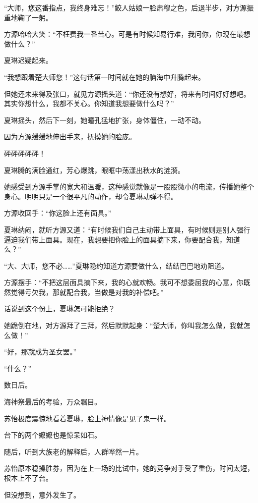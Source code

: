 
\begin{this_body}

“大师，您这番指点，我终身难忘！”鲛人姑娘一脸肃穆之色，后退半步，对方源振重地鞠了一躬。

方源哈哈大笑：“不枉费我一番苦心。可是有时候知易行难，我问你，你现在最想做什么？”

夏琳迟疑起来。

“我想跟着楚大师您！”这句话第一时间就在她的脑海中升腾起来。

但她还未来得及张口，就见方源摇头道：“你还没有想好，将来有时间好好想吧。其实你想什么，我都不关心。你知道我想要做什么吗？”

夏琳摇头，然后下一刻，她瞳孔猛地扩张，身体僵住，一动不动。

因为方源缓缓地伸出手来，抚摸她的脸庞。

砰砰砰砰砰！

夏琳腾的满脸通红，芳心爆跳，眼眶中荡漾出秋水的涟漪。

她感受到方源手掌的宽大和温暖，这种感觉就像是一股股微小的电流，传播她整个身心。明明只是一个很平凡的动作，却令夏琳动弹不得。

方源收回手：“你这脸上还有面具。”

夏琳纳闷，就听方源又道：“有时候我们自己主动带上面具，有时候则是别人强行逼迫我们带上面具。现在，我想要把你脸上的面具摘下来，你要配合我，知道么？”

“大、大师，您不必……”夏琳隐约知道方源要做什么，结结巴巴地劝阻道。

方源摆手：“不把这层面具摘下来，我的心就欢畅。我可不想委屈我的心意，你既然觉得亏欠我，那就配合我，当做是对我的补偿吧。”

话说到这个份上，夏琳怎可能拒绝？

她跪倒在地，对方源拜了三拜，然后默默起身：“楚大师，你叫我怎么做，我就怎么做！”

“好，那就成为圣女罢。”

“什么？”

数日后。

海神祭最后的考验，万众瞩目。

苏怡极度震惊地看着夏琳，脸上神情像是见了鬼一样。

台下的两个嬷嬷也是惊呆如石。

随后，听到大族老的解释后，人群哗然一片。

苏怡原本稳操胜券，因为在上一场的比试中，她的竞争对手受了重伤，时间太短，根本上不了台。

但没想到，意外发生了。


\end{this_body}

